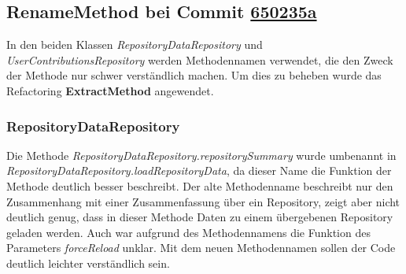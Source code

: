 \documentclass[12pt]{article}
\begin{document}
\subsection{RenameMethod bei Commit \href{https://github.com/lukaspanni/OpenSourceStats/commit/650235a5868f35cd0c641f0112b921ddead17a17} {650235a}}
\label{sec:RenameMethod_Repositories}

In den beiden Klassen \textit{RepositoryDataRepository} und \textit{UserContributionsRepository} werden Methodennamen verwendet, die den Zweck der Methode nur schwer verständlich machen. Um dies zu beheben wurde das Refactoring \textbf{ExtractMethod} angewendet.
\subsubsection*{RepositoryDataRepository}
Die Methode \textit{RepositoryDataRepository.repositorySummary} wurde umbenannt in \textit{RepositoryDataRepository.loadRepositoryData}, da dieser Name die Funktion der Methode deutlich besser beschreibt. Der alte Methodenname beschreibt nur den Zusammenhang mit einer Zusammenfassung über ein Repository, zeigt aber nicht deutlich genug, dass in dieser Methode Daten zu einem übergebenen Repository geladen werden. Auch war aufgrund des Methodennamens die Funktion des Parameters \textit{forceReload} unklar.
Mit dem neuen Methodennamen sollen der Code deutlich leichter verständlich sein.
\end{document}

